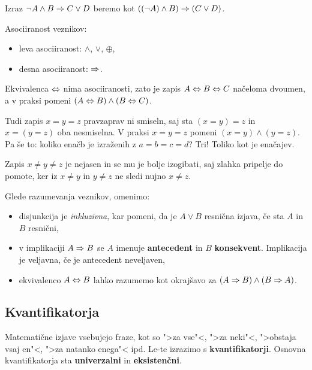 \begin{primer}
  Izraz $\neg A \land B \Rightarrow C \lor D$ beremo kot $((\neg  A) \land B) \Rightarrow (C \lor D)$.
\end{primer}

Asociiranost veznikov:
%
\begin{itemize}
\item leva asociiranost: $\land$, $\lor$, $\oplus$,
\item desna asociiranost: $\Rightarrow$.
\end{itemize}
%
Ekvivalenca $\Leftrightarrow$ nima asociiranosti, zato je zapis $A \Leftrightarrow B \Leftrightarrow C$ načeloma dvoumen, a v praksi pomeni $(A \Leftrightarrow B) \land (B \Leftrightarrow C)$.

\begin{opomba}
  Tudi zapis $x = y = z$ pravzaprav ni smiseln, saj sta $(x = y) = z$ in $x = (y = z)$ oba nesmiselna. V praksi $x = y = z$ pomeni $(x = y) \land (y = z)$. Pa še to: koliko enačb je izraženih z $a = b = c = d$? Tri! Toliko kot je enačajev.
\end{opomba}

\begin{opomba}
  Zapis $x \neq y \neq z$ je nejasen in se mu je bolje izogibati, saj zlahka pripelje do pomote, ker iz $x
  \neq y$ in $y \neq z$ ne sledi nujno $x \neq z$.
\end{opomba}

Glede razumevanja veznikov, omenimo:
%
\begin{itemize}
\item disjunkcija je \emph{inkluzivna}, kar pomeni, da je $A \lor B$ resnična izjava, če sta $A$ in $B$ resnični,
\item v implikaciji $A \Rightarrow B$ se $A$ imenuje \textbf{antecedent} in $B$ \textbf{konsekvent}. Implikacija je veljavna, če je antecedent neveljaven,
\item ekvivalenco $A \Leftrightarrow B$ lahko razumemo kot okrajšavo za $(A \Rightarrow B) \land (B \Rightarrow A)$.
\end{itemize}

\subsection{Kvantifikatorja}

Matematične izjave vsebujejo fraze, kot so ">za vse"<, ">za neki"<, ">obstaja vsaj en"<, ">za natanko enega"< ipd. Le-te izrazimo s \textbf{kvantifikatorji}. Osnovna kvantifikatorja sta \textbf{univerzalni} in \textbf{eksistenčni}.


